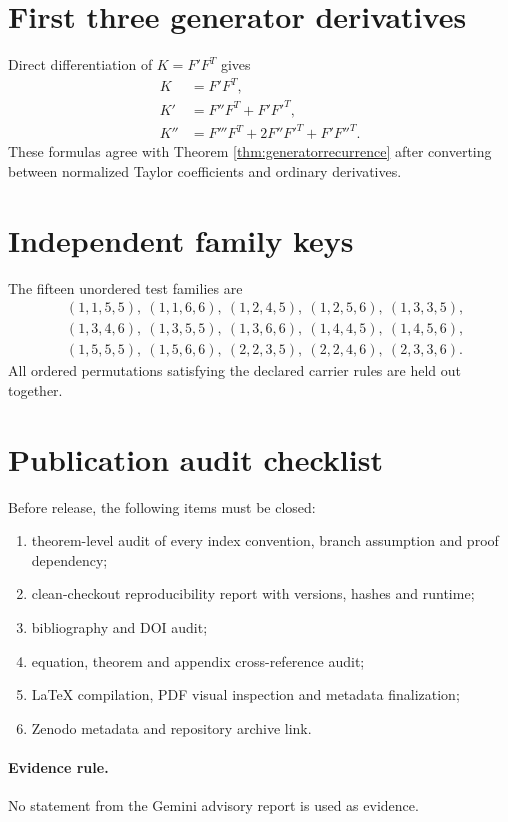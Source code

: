 \appendix
\section{First three generator derivatives}
Direct differentiation of $K=F'F^T$ gives
\begin{align}
K&=F'F^T,\\
K'&=F''F^T+F'F'^T,\\
K''&=F'''F^T+2F''F'^T+F'F''^T.
\end{align}
These formulas agree with Theorem \ref{thm:generatorrecurrence} after converting between normalized Taylor coefficients and ordinary derivatives.

\section{Independent family keys}
The fifteen unordered test families are
\begin{align*}
&(1,1,5,5),\ (1,1,6,6),\ (1,2,4,5),\ (1,2,5,6),\ (1,3,3,5),\\
&(1,3,4,6),\ (1,3,5,5),\ (1,3,6,6),\ (1,4,4,5),\ (1,4,5,6),\\
&(1,5,5,5),\ (1,5,6,6),\ (2,2,3,5),\ (2,2,4,6),\ (2,3,3,6).
\end{align*}
All ordered permutations satisfying the declared carrier rules are held out together.

\section{Publication audit checklist}
Before release, the following items must be closed:
\begin{enumerate}[label=G\arabic*.]
\item theorem-level audit of every index convention, branch assumption and proof dependency;
\item clean-checkout reproducibility report with versions, hashes and runtime;
\item bibliography and DOI audit;
\item equation, theorem and appendix cross-reference audit;
\item LaTeX compilation, PDF visual inspection and metadata finalization;
\item Zenodo metadata and repository archive link.
\end{enumerate}

\paragraph{Evidence rule.}
No statement from the Gemini advisory report is used as evidence.

